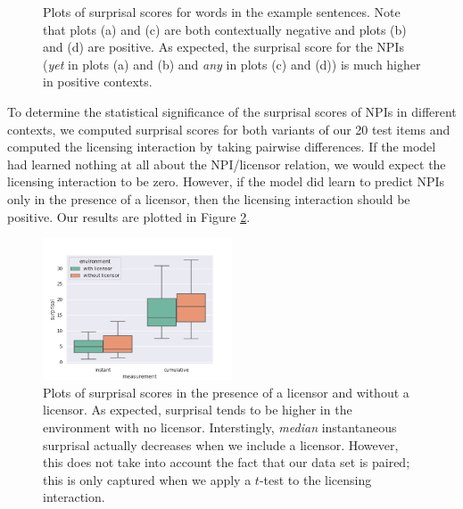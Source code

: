 \documentclass[11pt, round]{article}
\begin{document}
\begin{figure}
    \qquad
    \caption{Plots of surprisal scores for words in the example sentences. Note that plots (a) and (c) are both contextually negative and plots (b) and (d) are positive. As expected, the surprisal score for the NPIs (\textit{yet} in plots (a) and (b) and \textit{any} in plots (c) and (d)) is much higher in positive contexts.}
    \label{fig:surprisal-basic-licensing}
\end{figure}

To determine the statistical significance of the surprisal scores of NPIs in different contexts, we computed surprisal scores for both variants of our 20 test items and computed the licensing interaction by taking pairwise differences. If the model had learned nothing at all about the NPI/licensor relation, we would expect the licensing interaction to be zero. However, if the model did learn to predict NPIs only in the presence of a licensor, then the licensing interaction should be positive. Our results are plotted in Figure \ref{fig:basic-detection-box-plot}.

\begin{figure}
    \centering
    \includegraphics[width=0.5\textwidth]{surprisal-c-command-box-plot}
    \caption{Plots of surprisal scores in the presence of a licensor and without a licensor. As expected, surprisal tends to be higher in the environment with no licensor. Interstingly, \textit{median} instantaneous surprisal actually decreases when we include a licensor. However, this does not take into account the fact that our data set is paired; this is only captured when we apply a $t$-test to the licensing interaction.}
    \label{fig:basic-detection-box-plot}
\end{figure}
\end{document}
